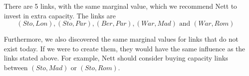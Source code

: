 There are 5 links, with the same marginal value, which we recommend Nett to invest in extra capacity. The links are
$$
(Sto,Lon), (Sto,Par), (Ber,Par), (War,Mad) \text{ and }(War,Rom)
$$

Furthermore, we also discovered the same marginal values for links that do not exist today. If we were to create them, they would have the same influence as the links stated above. For example, Nett should consider buying capacity links between $(Sto,Mad)$ or $(Sto,Rom)$.
